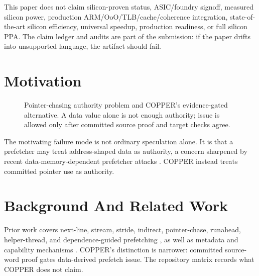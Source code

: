 \documentclass[10pt]{article}
\begin{document}
This paper does not claim silicon-proven status, ASIC/foundry signoff, measured silicon power, production ARM/OoO/TLB/cache/coherence integration, state-of-the-art silicon efficiency, universal speedup, production readiness, or full silicon PPA. The claim ledger and audits are part of the submission: if the paper drifts into unsupported language, the artifact should fail.

\section{Motivation}
\begin{figure}[H]
\centering
{}
\caption{Pointer-chasing authority problem and COPPER's evidence-gated alternative. A data value alone is not enough authority; issue is allowed only after committed source proof and target checks agree.}
\label{fig:motivation}
\end{figure}

The motivating failure mode is not ordinary speculation alone. It is that a prefetcher may treat address-shaped data as authority, a concern sharpened by recent data-memory-dependent prefetcher attacks \cite{augury,gofetch}. COPPER instead treats committed pointer use as authority.

\section{Background And Related Work}
Prior work covers next-line, stream, stride, indirect, pointer-chase, runahead, helper-thread, and dependence-guided prefetching \cite{jouppi1990improving,chen1995effective,baer1991effective,roth1998dependence,srinath2007feedback}, as well as metadata and capability mechanisms \cite{cheri}. COPPER's distinction is narrower: committed source-word proof gates data-derived prefetch issue. The repository matrix records what COPPER does not claim.
\end{document}
